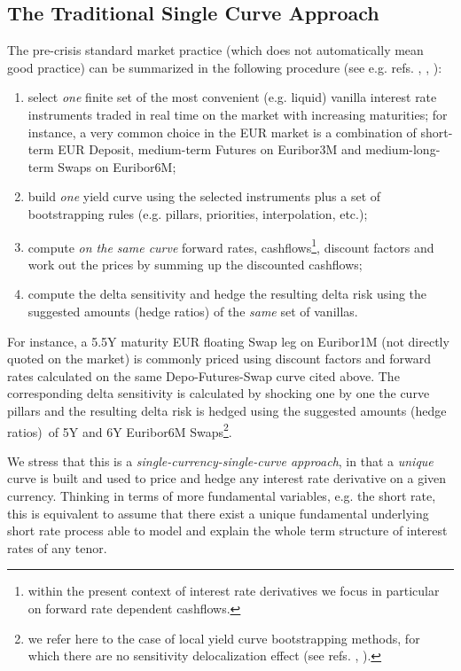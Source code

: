 \documentclass[11pt,reqno]{amsart}
\begin{document}
\subsection{\label{sec:SingleCurve}The Traditional Single Curve Approach}
\par
The pre-crisis standard market practice (which does not automatically mean good practice) can be summarized in the following procedure (see e.g. refs. \cite{Ron00}, \cite{HagWes06}, \cite{And07} \cite{HagWes08}):
\begin{enumerate}
\item select \emph{one} finite set of the most convenient (e.g. liquid) vanilla interest rate instruments traded in real time on the market with increasing maturities; for instance, a very common choice in the EUR market is a combination of short-term EUR Deposit, medium-term Futures on Euribor3M and medium-long-term Swaps on Euribor6M;

\item build \emph{one} yield curve using the selected instruments plus a set of bootstrapping rules (e.g. pillars, priorities, interpolation, etc.);

\item compute \emph{on the same curve} forward rates, cashflows\footnote{within the present context of interest rate derivatives we focus in particular on forward rate dependent cashflows.}, discount factors and work out the prices by summing up the discounted cashflows;

\item compute the delta sensitivity and hedge the resulting delta risk using the suggested amounts (hedge ratios) of the \emph{same} set of vanillas.
\end{enumerate}
For instance, a 5.5Y maturity EUR floating Swap leg on Euribor1M (not directly quoted on the market) is commonly priced using discount factors and forward rates calculated on the same Depo-Futures-Swap curve cited above. The corresponding delta sensitivity is calculated by shocking one by one the curve pillars and the resulting delta risk is hedged using the suggested amounts (hedge ratios)\ of 5Y and 6Y Euribor6M Swaps\footnote{we refer here to the case of local yield curve bootstrapping methods, for which there are no sensitivity delocalization effect (see refs. \cite{HagWes06}, \cite{And07} \cite{HagWes08}).}.
\par
We stress that this is a \emph{single-currency-single-curve approach}, in that a \emph{unique} curve is built and used to price and hedge any interest rate derivative on a given currency. Thinking in terms of more fundamental variables, e.g. the short rate, this is equivalent to assume that there exist a unique fundamental underlying short rate process able to model and explain the whole term structure of interest rates of any tenor.
\end{document}
